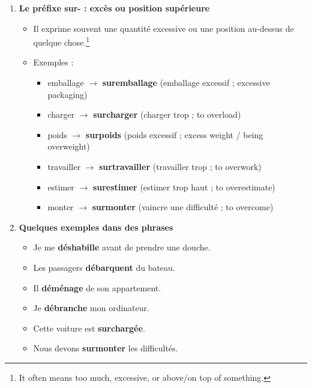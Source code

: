 \documentclass[math,code]{amznotes}
\theoremstyle{remark}
\begin{document}
\begin{enumerate}
    \item \textbf{Le préfixe sur- : excès ou position supérieure}
    \begin{itemize}
        \item Il exprime souvent une quantité excessive ou une position au-dessus de quelque chose.\footnote{It often means too much, excessive, or above/on top of something.}
        \item Exemples :
        \begin{itemize}
            \item emballage $\rightarrow$ \textbf{suremballage} (emballage excessif ; excessive packaging)
            \item charger $\rightarrow$ \textbf{surcharger} (charger trop ; to overload)
            \item poids $\rightarrow$ \textbf{surpoids} (poids excessif ; excess weight / being overweight)
            \item travailler $\rightarrow$ \textbf{surtravailler} (travailler trop ; to overwork)
            \item estimer $\rightarrow$ \textbf{surestimer} (estimer trop haut ; to overestimate)
            \item monter $\rightarrow$ \textbf{surmonter} (vaincre une difficulté ; to overcome)
        \end{itemize}
    \end{itemize}

    \item \textbf{Quelques exemples dans des phrases}
    \begin{itemize}
        \item Je me \textbf{déshabille} avant de prendre une douche.
        \item Les passagers \textbf{débarquent} du bateau.
        \item Il \textbf{déménage} de son appartement.
        \item Je \textbf{débranche} mon ordinateur.
        \item Cette voiture est \textbf{surchargée}.
        \item Nous devons \textbf{surmonter} les difficultés.
    \end{itemize}
\end{enumerate}
\end{document}
